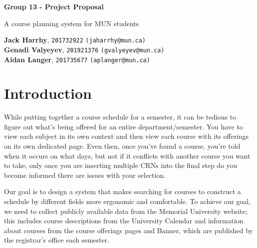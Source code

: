 \documentclass[12pt]{article}
\begin{document}
\begin{titlepage}
    \begin{center}
        \vspace*{1cm}
            
        \Huge
        \textbf{Group 13 - Project Proposal}
            
        \vspace{0.5cm}
        \LARGE
        A course planning system for MUN students
            
        \vspace{1.5cm}
            
        \textbf{Jack Harrhy}, \texttt{201732922} \texttt{(jaharrhy@mun.ca)} \\
        \textbf{Genadi Valyeyev}, \texttt{201921376} \texttt{(gvalyeyev@mun.ca)}\\
        \textbf{Aidan Langer}, \texttt{201735677} \texttt{(aplanger@mun.ca)}\\
            
        \vfill
    \end{center}
\end{titlepage}
\section{Introduction}
While putting together a course schedule for a semester, it can be tedious to figure out what's being offered for an entire department/semester. You have to view each subject in its own context and then view 
each course with its offerings on its own dedicated page. Even then, once you've found a course, you're told when it occurs on what days, but not if it conflicts with another course you want to take, 
only once you are inserting multiple CRNs into the final step do you become informed there are issues with your selection. \par
Our goal is to design a system that makes searching for courses to construct a schedule by different fields more ergonomic and comfortable. To achieve our goal, we need to collect publicly available data from the 
Memorial University website; this includes course descriptions from the University Calendar and information about courses from the course offerings pages and Banner, which are published by the registrar's office 
each semester.
\end{document}
